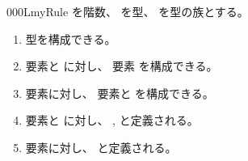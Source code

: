 \documentclass[index]{subfiles}
\begin{document}
\begin{myBlock}{000L}{myRule}
  を階数、
  を型、
  を型の族とする。
  \begin{enumerate}
  \item 型を構成できる。
  \item 要素と
    に対し、
    要素
    を構成できる。
  \item 要素に対し、
    要素と
    を構成できる。
  \item 要素と
    に対し、
    ,
    と定義される。
  \item 要素に対し、
    と定義される。
  \end{enumerate}
\end{myBlock}
\end{document}
